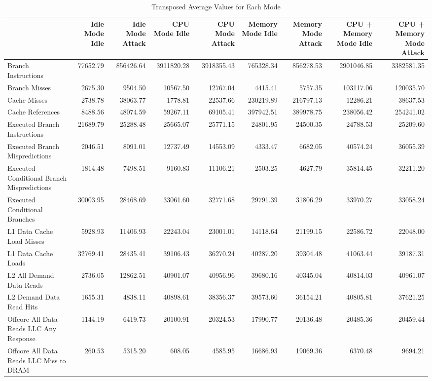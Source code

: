 \begin{table}
\caption{Transposed Average Values for Each Mode}
\label{tab:transposed_average_summary}
\begin{tabular}{lrrrrrrrr}
\toprule
 & Idle Mode Idle & Idle Mode Attack & CPU Mode Idle & CPU Mode Attack & Memory Mode Idle & Memory Mode Attack & CPU + Memory Mode Idle & CPU + Memory Mode Attack \\
\midrule
Branch Instructions & 77652.79 & 856426.64 & 3911820.28 & 3918355.43 & 765328.34 & 856278.53 & 2901046.85 & 3382581.35 \\
Branch Misses & 2675.30 & 9504.50 & 10567.50 & 12767.04 & 4415.41 & 5757.35 & 103117.06 & 120035.70 \\
Cache Misses & 2738.78 & 38063.77 & 1778.81 & 22537.66 & 230219.89 & 216797.13 & 12286.21 & 38637.53 \\
Cache References & 8488.56 & 48074.59 & 59267.11 & 69105.41 & 397942.51 & 389978.75 & 238056.42 & 254241.02 \\
Executed Branch Instructions & 21689.79 & 25288.48 & 25665.07 & 25771.15 & 24801.95 & 24500.35 & 24788.53 & 25209.60 \\
Executed Branch Mispredictions & 2046.51 & 8091.01 & 12737.49 & 14553.09 & 4333.47 & 6682.05 & 40574.24 & 36055.39 \\
Executed Conditional Branch Mispredictions & 1814.48 & 7498.51 & 9160.83 & 11106.21 & 2503.25 & 4627.79 & 35814.45 & 32211.20 \\
Executed Conditional Branches & 30003.95 & 28468.69 & 33061.60 & 32771.68 & 29791.39 & 31806.29 & 33970.27 & 33058.24 \\
L1 Data Cache Load Misses & 5928.93 & 11406.93 & 22243.04 & 23001.01 & 14118.64 & 21199.15 & 22586.72 & 22048.00 \\
L1 Data Cache Loads & 32769.41 & 28435.41 & 39106.43 & 36270.24 & 40287.20 & 39304.48 & 41063.44 & 39187.31 \\
L2 All Demand Data Reads & 2736.05 & 12862.51 & 40901.07 & 40956.96 & 39680.16 & 40345.04 & 40814.03 & 40961.07 \\
L2 Demand Data Read Hits & 1655.31 & 4838.11 & 40898.61 & 38356.37 & 39573.60 & 36154.21 & 40805.81 & 37621.25 \\
Offcore All Data Reads LLC Any Response & 1144.19 & 6419.73 & 20100.91 & 20324.53 & 17990.77 & 20136.48 & 20485.36 & 20459.44 \\
Offcore All Data Reads LLC Miss to DRAM & 260.53 & 5315.20 & 608.05 & 4585.95 & 16686.93 & 19069.36 & 6370.48 & 9694.21 \\

\end{tabular}
\end{table}
